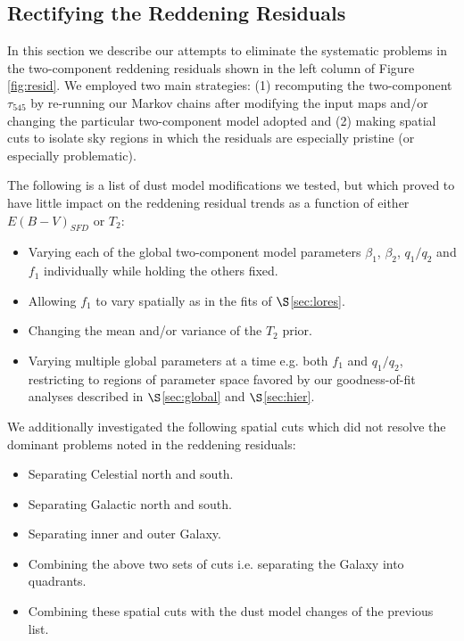 \documentclass{emulateapj}
\begin{document}
\subsection{Rectifying the Reddening Residuals}
In this section we describe our attempts to eliminate the systematic
problems in the two-component reddening residuals shown in the left column
of Figure \ref{fig:resid}. We employed two main strategies: (1) recomputing
the two-component $\tau_{545}$ by re-running our Markov chains after modifying 
the input maps and/or changing the particular two-component model adopted and
(2) making spatial cuts to isolate sky regions in which the 
residuals are especially pristine (or especially problematic).

The following is a list of dust model modifications we tested, but which
proved to have little impact on the reddening residual trends as a function 
of either $E(B-V)_{SFD}$ or $T_2$:

\begin{itemize}
\item Varying each of the global two-component model parameters $\beta_1$, 
$\beta_2$, $q_1/q_2$ and $f_1$ individually while holding the others fixed.
\vspace{-3mm}
\item Allowing $f_1$ to vary spatially as in the fits of $\S$\ref{sec:lores}.
\vspace{-2mm}
\item Changing the mean and/or variance of the $T_2$ prior.
\vspace{-6mm}
\item Varying multiple global parameters at a time e.g. both $f_1$ and 
$q_1/q_2$, restricting to regions of parameter space favored by our 
goodness-of-fit analyses described in $\S$\ref{sec:global} and 
$\S$\ref{sec:hier}.
\end{itemize}

We additionally investigated the following spatial cuts which did not resolve 
the dominant problems noted in the reddening residuals:
\begin{itemize}
\item Separating Celestial north and south.
\vspace{-3mm}
\item Separating Galactic north and south.
\vspace{-3mm}
\item Separating inner and outer Galaxy.
\vspace{-3mm}
\item Combining the above two sets of cuts i.e. separating the Galaxy into
quadrants. 
\vspace{-3mm}
\item Combining these spatial cuts with the dust model changes of the previous
list.
\end{itemize}
\end{document}
